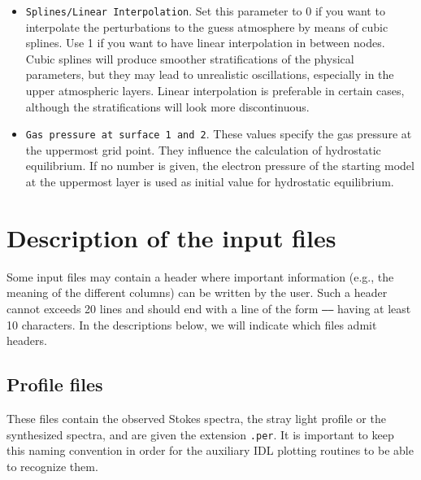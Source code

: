 \begin{itemize}
\item {\tt Splines/Linear Interpolation}. Set this parameter to 0 if you 
want to interpolate the perturbations to the guess atmosphere by means
of cubic splines. Use 1 if you want to have linear interpolation in 
between nodes. Cubic splines will produce smoother stratifications of
the physical parameters, but they may lead to unrealistic oscillations,
especially in the upper atmospheric layers. Linear interpolation is
preferable in certain cases, although the stratifications will look 
more discontinuous.

\item {\tt Gas pressure at surface 1 and 2}. These values specify 
the gas pressure at the uppermost grid point. They influence 
the calculation of hydrostatic equilibrium. If no number is given, 
the electron pressure of the starting model at the uppermost layer 
is used as initial value for hydrostatic equilibrium.

\end{itemize}  

\section{Description of the input files}
Some input files may contain a header where important information
(e.g., the meaning of the different columns) can be written by the
user. Such a header cannot exceeds 20 lines and should end with a line
of the form {\tt -----} having at least 10 characters. In the
descriptions below, we will indicate which files admit headers.

\subsection{Profile files}
\label{profiles}
These files contain the observed Stokes spectra, the stray light profile or
the synthesized spectra, and are given the extension {\tt .per}. It
is important to keep this naming convention in order for the auxiliary IDL 
plotting routines to be able to recognize them. 

